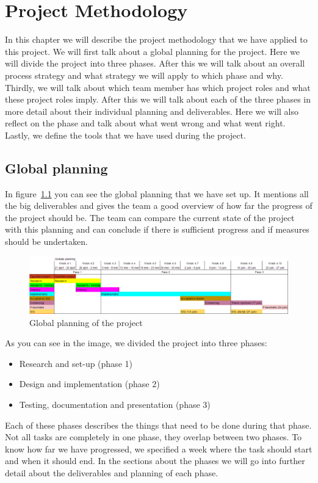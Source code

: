 \chapter{Project Methodology}
\label{sec:methodology}
In this chapter we will describe the project methodology that we have applied to this project.
We will first talk about a global planning for the project.
Here we will divide the project into three phases.
After this we will talk about an overall process strategy and what strategy we will apply to which phase and why.
Thirdly, we will talk about which team member has which project roles and what these project roles imply.
After this we will talk about each of the three phases in more detail about their individual planning and deliverables.
Here we will also reflect on the phase and talk about what went wrong and what went right.
Lastly, we define the tools that we have used during the project.

\section{Global planning}
In figure~\ref{global_planning} you can see the global planning that we have set up.
It mentions all the big deliverables and gives the team a good overview of how far the progress of the project should be.
The team can compare the current state of the project with this planning and can conclude if there is sufficient progress and if measures should be undertaken.

\begin{figure}[h]
    \centering
    \includegraphics[width=\textwidth]{images/Global_planning}
    \caption{Global planning of the project}
    \label{global_planning}
\end{figure}

As you can see in the image, we divided the project into three phases:
\begin{itemize}
\item Research and set-up (phase 1)
\item Design and implementation (phase 2)
\item Testing, documentation and presentation (phase 3)
\end{itemize}
Each of these phases describes the things that need to be done during that phase.
Not all tasks are completely in one phase, they overlap between two phases.
To know how far we have progressed, we specified a week where the task should start and when it should end.
In the sections about the phases we will go into further detail about the deliverables and planning of each phase.

